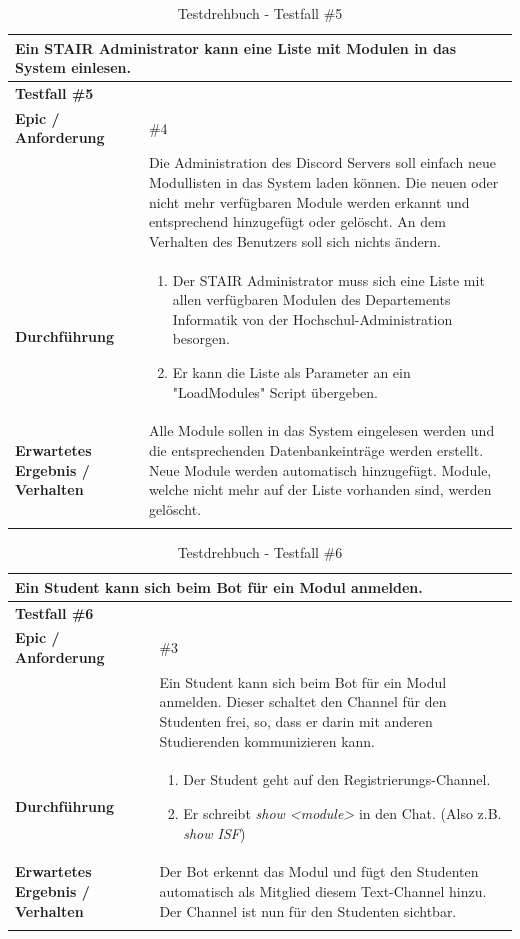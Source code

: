 \documentclass[a4paper, table]{article}
\begin{document}
\begin{longtable}[h]{|p{15em}|p{25em}|}
    \hline
    \multicolumn{2}{|l|}{\textbf{Ein STAIR Administrator kann eine Liste mit Modulen in das System einlesen.}} \\
    \hline
    \multicolumn{2}{|l|}{\textbf{Testfall \#5}} \\
    \hline
    \textbf{Epic / Anforderung} & \#4 \\*
     & Die Administration des Discord Servers soll einfach neue Modullisten in das System laden können.
     Die neuen oder nicht mehr verfügbaren Module werden erkannt und entsprechend hinzugefügt oder gelöscht.
     An dem Verhalten des Benutzers soll sich nichts ändern. \\
    \hline
    \textbf{Durchführung} &
    \begin{enumerate}
        \item Der STAIR Administrator muss sich eine Liste mit allen verfügbaren Modulen des Departements Informatik von der Hochschul-Administration besorgen.
        \item Er kann die Liste als Parameter an ein "LoadModules" Script übergeben.
    \end{enumerate}\\
    \hline
    \textbf{Erwartetes Ergebnis / Verhalten} & Alle Module sollen in das System eingelesen werden und
    die entsprechenden Datenbankeinträge werden erstellt.
    Neue Module werden automatisch hinzugefügt.
    Module, welche nicht mehr auf der Liste vorhanden sind, werden gelöscht. \\
    \hline
    \caption{Testdrehbuch - Testfall \#5}
\end{longtable}

\begin{longtable}[h]{|p{15em}|p{25em}|}
    \hline
    \multicolumn{2}{|l|}{\textbf{Ein Student kann sich beim Bot für ein Modul anmelden.}} \\
    \hline
    \multicolumn{2}{|l|}{\textbf{Testfall \#6}} \\
    \hline
    \textbf{Epic / Anforderung} & \#3 \\*
     & Ein Student kann sich beim Bot für ein Modul anmelden.
     Dieser schaltet den Channel für den Studenten frei, so, dass er darin mit anderen Studierenden kommunizieren kann. \\
    \hline
    \textbf{Durchführung} &
    \begin{enumerate}
        \item Der Student geht auf den Registrierungs-Channel.
        \item Er schreibt \textit{show <module>} in den Chat. (Also z.B. \textit{show ISF})
    \end{enumerate}\\
    \hline
    \textbf{Erwartetes Ergebnis / Verhalten} & Der Bot erkennt das Modul und fügt den Studenten automatisch als Mitglied diesem Text-Channel hinzu.
    Der Channel ist nun für den Studenten sichtbar. \\
    \hline
    \caption{Testdrehbuch - Testfall \#6}
\end{longtable}
\end{document}
